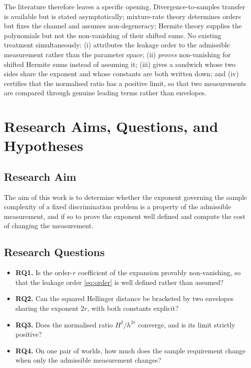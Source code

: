 \documentclass[conference]{IEEEtran}
\theoremstyle{definition}
\begin{document}
The literature therefore leaves a specific opening. Divergence-to-samples transfer is
available but is stated asymptotically; mixture-rate theory determines orders but fixes the
channel and assumes non-degeneracy; Hermite theory supplies the polynomials but not the
non-vanishing of their shifted sums. No existing treatment simultaneously: (i) attributes
the leakage order to the admissible measurement rather than the parameter space;
(ii) \emph{proves} non-vanishing for shifted Hermite sums instead of assuming it;
(iii) gives a sandwich whose two sides share the exponent and whose constants are both
written down; and (iv) certifies that the normalised ratio has a positive limit, so that two
measurements are compared through genuine leading terms rather than envelopes.

\section{Research Aims, Questions, and Hypotheses}

\subsection{Research Aim}

The aim of this work is to determine whether the exponent governing the sample complexity of
a fixed discrimination problem is a property of the admissible measurement, and if so to
prove the exponent well defined and compute the cost of changing the measurement.

\subsection{Research Questions}

\begin{itemize}
\item \textbf{RQ1.} Is the order-$r$ coefficient of the expansion provably non-vanishing, so
that the leakage order \eqref{eq:order} is well defined rather than assumed?
\item \textbf{RQ2.} Can the squared Hellinger distance be bracketed by two envelopes sharing
the exponent $2r$, with both constants explicit?
\item \textbf{RQ3.} Does the normalised ratio $H^{2}/h^{2r}$ converge, and is its limit
strictly positive?
\item \textbf{RQ4.} On one pair of worlds, how much does the sample requirement change when
only the admissible measurement changes?
\end{itemize}
\end{document}
